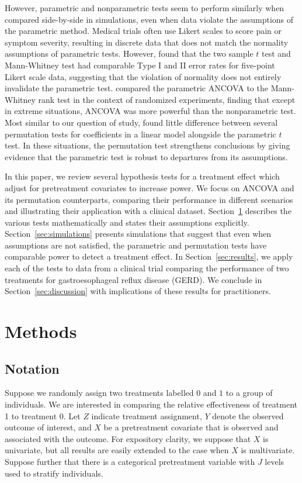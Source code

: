 \documentclass[12pt]{article}
\begin{document}
However, parametric and nonparametric tests seem to perform similarly when compared side-by-side in simulations, even when data violate the assumptions of the parametric method.
Medical trials often use Likert scales to score pain or symptom severity, resulting in discrete data that does not match the normality assumptions of parametric tests.
However, \cite{winter_five-point_2010} found that the two sample $t$ test and Mann-Whitney test had comparable Type I and II error rates for five-point Likert scale data, suggesting that the violation of normality does not entirely invalidate the parametric test.
\cite{vickers_parametric_2005} compared the parametric ANCOVA to the Mann-Whitney rank test in the context of randomized experiments, finding that except in extreme situations, ANCOVA was more powerful than the nonparametric test.
Most similar to our question of study, \cite{anderson_empirical_1999} found little difference between several permutation tests for coefficients in a linear model alongside the parametric $t$ test.
In these situations, the permutation test strengthens conclusions by giving evidence that the parametric test is robust to departures from its assumptions.

In this paper, we review several hypothesis tests for a treatment effect which adjust for pretreatment covariates to increase power.  
We focus on ANCOVA and its permutation counterparts, comparing their performance in different scenarios and illustrating their application with a clinical dataset.
Section~\ref{sec:methods} describes the various tests mathematically and states their assumptions explicitly.
Section~\ref{sec:simulations} presents simulations that suggest that even when assumptions are not satisfied, the parametric and permutation tests have comparable power to detect a treatment effect.
In Section~\ref{sec:results}, we apply each of the tests to data from a clinical trial comparing the performance of two treatments for gastroesophageal reflux disease (GERD).
We conclude in Section~\ref{sec:discussion} with implications of these results for practitioners.

\section{Methods}\label{sec:methods}

\subsection{Notation}
Suppose we randomly assign two treatments labelled $0$ and $1$ to a group of individuals.
We are interested in comparing the relative effectiveness of treatment 1 to treatment 0.
Let $Z$ indicate treatment assignment,
$Y$ denote the observed outcome of interest,
and $X$ be a pretreatment covariate that is observed and associated with the outcome.
For expository clarity, we suppose that $X$ is univariate, but all results are easily extended to the case when $X$ is multivariate.
Suppose further that there is a categorical pretreatment variable with $J$ levels used to stratify individuals. 
\end{document}
